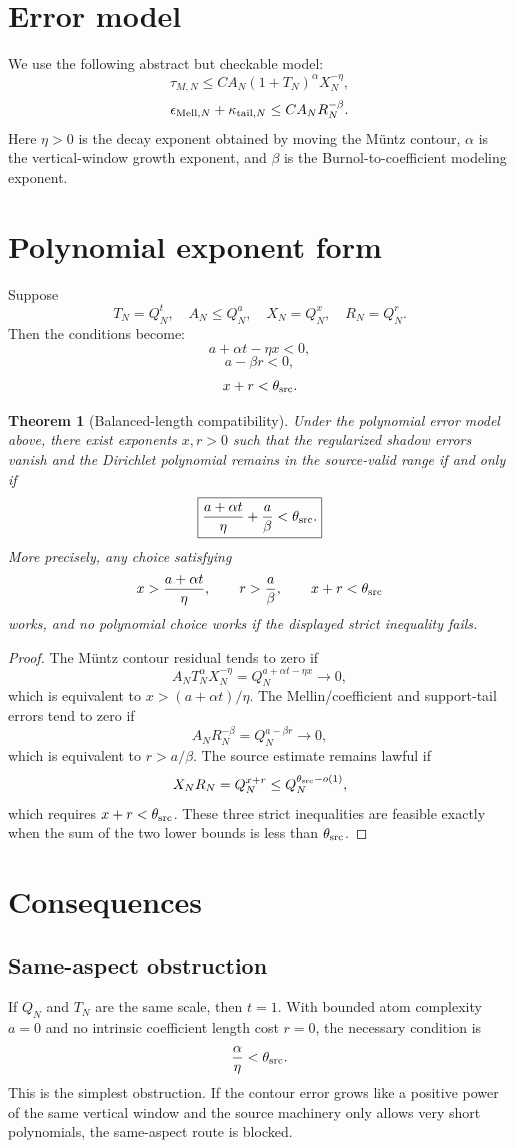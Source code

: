 \documentclass[11pt]{article}
\newtheorem{theorem}{Theorem}
\begin{document}
\section{Error model}
We use the following abstract but checkable model:
\[
\tau_{M,N}\le C A_N(1+T_N)^\alpha X_N^{-\eta},
\]
\[
\epsilon_{{\rm Mell},N}+\kappa_{{\rm tail},N}\le C A_NR_N^{-\beta}.
\]
Here \(\eta>0\) is the decay exponent obtained by moving the M\"untz contour, \(\alpha\) is the vertical-window growth exponent, and \(\beta\) is the Burnol-to-coefficient modeling exponent.

\section{Polynomial exponent form}
Suppose
\[
T_N=Q_N^t,
\quad
A_N\le Q_N^a,
\quad
X_N=Q_N^x,
\quad
R_N=Q_N^r.
\]
Then the conditions become:
\[
a+\alpha t-\eta x<0,
\]
\[
a-\beta r<0,
\]
\[
x+r<\theta_{\rm src}.
\]

\begin{theorem}[Balanced-length compatibility]
Under the polynomial error model above, there exist exponents \(x,r>0\) such that the regularized shadow errors vanish and the Dirichlet polynomial remains in the source-valid range if and only if
\[
\boxed{
\frac{a+\alpha t}{\eta}+\frac{a}{\beta}<\theta_{\rm src}.
}
\]
More precisely, any choice satisfying
\[
x>\frac{a+\alpha t}{\eta},
\qquad
r>\frac{a}{\beta},
\qquad
x+r<\theta_{\rm src}
\]
works, and no polynomial choice works if the displayed strict inequality fails.
\end{theorem}

\begin{proof}
The M\"untz contour residual tends to zero if
\[
A_NT_N^\alpha X_N^{-\eta}=Q_N^{a+\alpha t-\eta x}\to0,
\]
which is equivalent to \(x>(a+\alpha t)/\eta\).  The Mellin/coefficient and support-tail errors tend to zero if
\[
A_NR_N^{-\beta}=Q_N^{a-\beta r}\to0,
\]
which is equivalent to \(r>a/\beta\).  The source estimate remains lawful if
\[
X_NR_N=Q_N^{x+r}\le Q_N^{\theta_{\rm src}-o(1)},
\]
which requires \(x+r<\theta_{\rm src}\).  These three strict inequalities are feasible exactly when the sum of the two lower bounds is less than \(\theta_{\rm src}\).
\end{proof}

\section{Consequences}
\subsection{Same-aspect obstruction}
If \(Q_N\) and \(T_N\) are the same scale, then \(t=1\).  With bounded atom complexity \(a=0\) and no intrinsic coefficient length cost \(r=0\), the necessary condition is
\[
\frac{\alpha}{\eta}<\theta_{\rm src}.
\]
This is the simplest obstruction.  If the contour error grows like a positive power of the same vertical window and the source machinery only allows very short polynomials, the same-aspect route is blocked.
\end{document}

